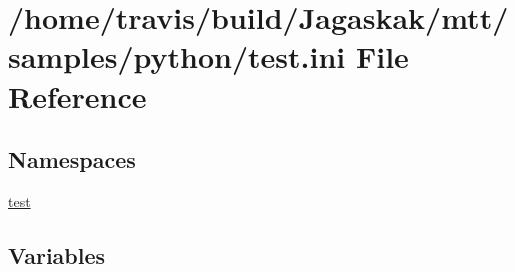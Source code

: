 \hypertarget{test_8ini}{\section{/home/travis/build/\-Jagaskak/mtt/samples/python/test.ini File Reference}
\label{test_8ini}
}
\subsection*{Namespaces}
\begin{DoxyCompactItemize}
\item 
\hyperlink{namespacetest}{test}
\end{DoxyCompactItemize}
\subsection*{Variables}
